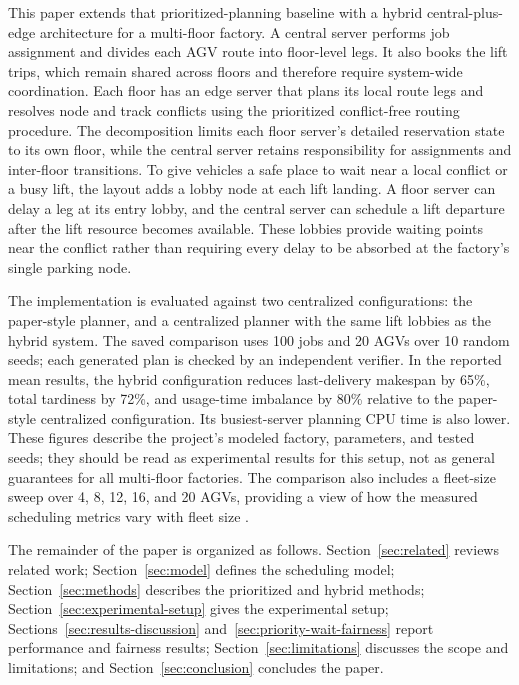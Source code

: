 This paper extends that prioritized-planning baseline with a hybrid
central-plus-edge architecture for a multi-floor factory. A central server
performs job assignment and divides each AGV route into floor-level legs. It
also books the lift trips, which remain shared across floors and therefore
require system-wide coordination. Each floor has an edge server that plans
its local route legs and resolves node and track conflicts using the
prioritized conflict-free routing procedure. The decomposition limits each
floor server's detailed reservation state to its own floor, while the central
server retains responsibility for assignments and inter-floor transitions.
To give vehicles a safe place to wait near a local conflict or a busy lift,
the layout adds a lobby node at each lift landing. A floor server can delay a
leg at its entry lobby, and the central server can schedule a lift departure
after the lift resource becomes available. These lobbies provide waiting
points near the conflict rather than requiring every delay to be absorbed at
the factory's single parking node.

The implementation is evaluated against two centralized configurations: the
paper-style planner, and a centralized planner with the same lift lobbies as
the hybrid system. The saved comparison uses 100 jobs and 20 AGVs over 10
random seeds; each generated plan is checked by an independent verifier. In
the reported mean results, the hybrid configuration reduces last-delivery
makespan by 65\%, total tardiness by 72\%, and usage-time imbalance by 80\%
relative to the paper-style centralized configuration. Its busiest-server
planning CPU time is also lower. These figures describe the project's
modeled factory, parameters, and tested seeds; they should be read as
experimental results for this setup, not as general guarantees for all
multi-floor factories. The comparison also includes a fleet-size sweep over
4, 8, 12, 16, and 20 AGVs, providing a view of how the measured scheduling
metrics vary with fleet size \cite{projectRepo}.

The remainder of the paper is organized as follows. Section~\ref{sec:related}
reviews related work; Section~\ref{sec:model} defines the scheduling model;
Section~\ref{sec:methods} describes the prioritized and hybrid methods;
Section~\ref{sec:experimental-setup} gives the experimental setup;
Sections~\ref{sec:results-discussion} and~\ref{sec:priority-wait-fairness}
report performance and fairness results; Section~\ref{sec:limitations}
discusses the scope and limitations; and Section~\ref{sec:conclusion}
concludes the paper.

